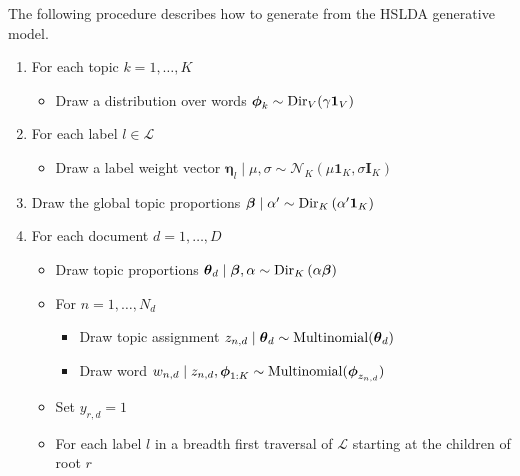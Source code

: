 The following procedure describes how to generate from the HSLDA generative
model.



\begin{shortbox}
\begin{enumerate}
\item For each topic $k=1,\ldots,K$

\begin{itemize}
\item Draw a distribution over words $\boldsymbol\phi_{k}\sim{\rm Dir}_{V}(\gamma\mathbf{1}_V)$%
\end{itemize}
\item For each label $l\in\mathcal{L}$

\begin{itemize}
\item Draw a label weight vector $\boldsymbol\eta_{l}\mid\mu,\sigma\sim\mathcal{N}_{K}(\mu \mathbf{1}_K,\sigma \mathbf{I}_{K})$  
\end{itemize}
\item Draw the global topic proportions $\boldsymbol\beta\mid\alpha'\sim{\rm Dir}_{K}\left(\alpha^{\prime}\mathbf{1}_K\right)$
\item For each document $d=1,\ldots,D$

\begin{itemize}
\item Draw topic proportions $\boldsymbol\theta_d\mid\boldsymbol\beta,\alpha\sim{\rm Dir}_{K}\left(\alpha\boldsymbol\beta\right)$ 
\item For $n=1,\ldots,N_{d}$

\begin{itemize}
\item Draw topic assignment $z_{n,d}\mid\boldsymbol\theta_d\sim{\rm Multinomial}(\boldsymbol\theta_d)$ 
\item Draw word $w_{n,d}\mid z_{n,d},\boldsymbol\phi_{1:K}\sim{\rm Multinomial}(\boldsymbol\phi_{z_{n,d}})$ 
\end{itemize}
\item Set $y_{r,d} = 1$
\item For each label $l$ in a breadth first traversal of $\mathcal{L}$ starting at the children of  root $r$


\end{itemize}
\end{enumerate}
\end{shortbox}
